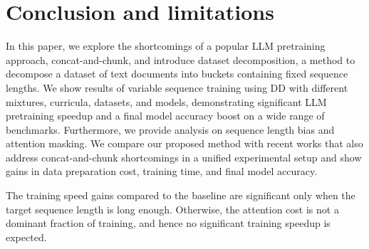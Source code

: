 \section{Conclusion and limitations}\label{sec:dicussion}
In this paper, we explore the shortcomings of a popular LLM pretraining approach, concat-and-chunk, and introduce dataset decomposition, a method to decompose a dataset of text documents into buckets containing fixed sequence lengths. We show results of variable sequence training using DD with different mixtures, curricula, datasets, and models, demonstrating significant LLM pretraining speedup and a final model accuracy boost on a wide range of benchmarks. Furthermore, we provide analysis on sequence length bias and attention masking. We compare our proposed method with recent works that also address concat-and-chunk shortcomings in a unified experimental setup and show gains in data preparation cost, training time, and final model accuracy.

 The training speed gains compared to the baseline are significant only when the target sequence length is long enough. Otherwise, the attention cost is not a dominant fraction of training, and hence no significant training speedup is expected.

